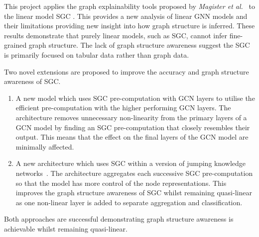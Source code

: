 
This project applies the graph explainability tools proposed by \textit{Magister et al.}~\cite{magister2021gcexplainer} to the linear model SGC \cite{wu2019simplifying}.
This provides a new analysis of linear GNN models and their limitations providing new insight into how graph structure is inferred.
These results demonstrate that purely linear models, such as SGC, cannot infer fine-grained graph structure.
The lack of graph structure awareness suggest the SGC is primarily focused on tabular data rather than graph data.

Two novel extensions are proposed to improve the accuracy and graph structure awareness of SGC.
\begin{enumerate}
    \item
        A new model which uses SGC pre-computation with GCN layers to utilise the efficient pre-computation with the higher performing GCN layers.
        The architecture removes unnecessary non-linearity from the primary layers of a GCN model by finding an SGC pre-computation that closely resembles their output.
        This means that the effect on the final layers of the GCN model are minimally affected.
    \item
        A new architecture which uses SGC within a version of jumping knowledge networks~\cite{xu2018representation}.
        The architecture aggregates each successive SGC pre-computation so that the model has more control of the node representations.
        This improves the graph structure awareness of SGC whilst remaining quasi-linear as one non-linear layer is added to separate aggregation and classification.        
\end{enumerate}
Both approaches are successful demonstrating graph structure awareness is achievable whilst remaining quasi-linear.





